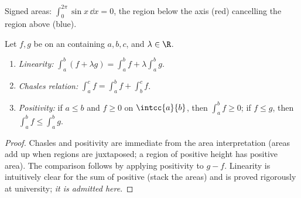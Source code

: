 \begin{omfigure}

{\small Signed areas: $\int_0^{2\pi} \sin x\,\dd x = 0$, the region
below the axis (red) cancelling the region above (blue).}
\end{omfigure}

\begin{proposition}\label{prop:g12:integ:properties}
Let $f, g$ be  on an  containing $a, b, c$, and
$\lambda \in \R$.
\begin{enumerate}
  \item \emph{Linearity:}
        $\displaystyle\int_a^b (f + \lambda g) = \int_a^b f + \lambda \int_a^b g$.
  \item \emph{Chasles relation:}
        $\displaystyle\int_a^c f = \int_a^b f + \int_b^c f$.
  \item \emph{Positivity:} if $a \leq b$ and $f \geq 0$ on $\intcc{a}{b}$,
        then $\displaystyle\int_a^b f \geq 0$; if $f \leq g$, then
        $\displaystyle\int_a^b f \leq \int_a^b g$.
\end{enumerate}
\end{proposition}

\begin{proof}
Chasles and positivity are immediate from the area interpretation (areas add
up when regions are juxtaposed; a region of positive height has positive
area). The comparison follows by applying positivity to $g - f$. Linearity is
intuitively clear for the sum of positive  (stack the areas) and is
proved rigorously at university; \emph{it is admitted here}.
\end{proof}

